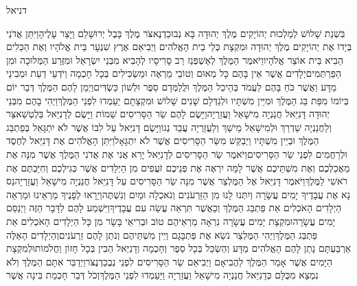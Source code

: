 \documentclass[../main/main.tex]{subfiles}
\begin{document}
\thispagestyle{empty}
\Incipit{}דניאל
\cleardoublepage
\RTLmulticolcolumns
\begin{multicols*}{\ncols}
בִּשְׁנַת שָׁלוֹשׁ לְמַלְכוּת יְהוֹיָקִים מֶלֶךְ יְהוּדָה בָּא נְבוּכַדְנֶאצֹּר מֶלֶךְ בָּבֶל יְרוּשָׁלֵם וַיָּצַר עָלֶיהָ\PreVerseSpace{}וַיִּתֵּן אֲדֹנַי בְּיָדוֹ אֶת יְהוֹיָקִים מֶלֶךְ יְהוּדָה וּמִקְצָת כְּלֵי בֵית הָאֱלֹהִים וַיְבִיאֵם אֶרֶץ שִׁנְעָר בֵּית אֱלֹהָיו וְאֶת הַכֵּלִים הֵבִיא בֵּית אוֹצַר אֱלֹהָיו\PreVerseSpace{}וַיֹּאמֶר הַמֶּלֶךְ לְאַשְׁפְּנַז רַב סָרִיסָיו לְהָבִיא מִבְּנֵי יִשְׂרָאֵל וּמִזֶּרַע הַמְּלוּכָה וּמִן הַפַּרְתְּמִים\PreVerseSpace{}יְלָדִים אֲשֶׁר אֵין בָּהֶם כָּל מְאוּם וְטוֹבֵי מַרְאֶה וּמַשְׂכִּילִים בְּכָל חָכְמָה וְיֹדְעֵי דַעַת וּמְבִינֵי מַדָּע וַאֲשֶׁר כֹּחַ בָּהֶם לַעֲמֹד בְּהֵיכַל הַמֶּלֶךְ וּלֲלַמְּדָם סֵפֶר וּלְשׁוֹן כַּשְׂדִּים\PreVerseSpace{}וַיְמַן לָהֶם הַמֶּלֶךְ דְּבַר יוֹם בְּיוֹמוֹ מִפַּת בַּג הַמֶּלֶךְ וּמִיֵּין מִשְׁתָּיו וּלְגַדְּלָם שָׁנִים שָׁלוֹשׁ וּמִקְצָתָם יַעַמְדוּ לִפְנֵי הַמֶּלֶךְ\PreVerseSpace{}וַיְהִי בָהֶם מִבְּנֵי יְהוּדָה דָּנִיֵּאל חֲנַנְיָה מִישָׁאֵל וַעֲזַרְיָה\PreVerseSpace{}וַיָּשֶׂם לָהֶם שַׂר הַסָּרִיסִים שֵׁמוֹת וַיָּשֶׂם לְדָנִיֵּאל בֵּלְטְשַׁאצַּר וְלַחֲנַנְיָה שַׁדְרַךְ וּלְמִישָׁאֵל מֵישַׁךְ וְלַעֲזַרְיָה עֲבֵד נְגוֹ\PreVerseSpace{}וַיָּשֶׂם דָּנִיֵּאל עַל לִבּוֹ אֲשֶׁר לֹא יִתְגָּאַל בְּפַתְבַּג הַמֶּלֶךְ וּבְיֵין מִשְׁתָּיו וַיְבַקֵּשׁ מִשַּׂר הַסָּרִיסִים אֲשֶׁר לֹא יִתְגָּאָל\PreVerseSpace{}וַיִּתֵּן הָאֱלֹהִים אֶת דָּנִיֵּאל לְחֶסֶד וּלְרַחֲמִים לִפְנֵי שַׂר הַסָּרִיסִים\PreVerseSpace{}וַיֹּאמֶר שַׂר הַסָּרִיסִים לְדָנִיֵּאל יָרֵא אֲנִי אֶת אֲדֹנִי הַמֶּלֶךְ אֲשֶׁר מִנָּה אֶת מַאֲכַלְכֶם וְאֶת מִשְׁתֵּיכֶם אֲשֶׁר לָמָּה יִרְאֶה אֶת פְּנֵיכֶם זֹעֲפִים מִן הַיְלָדִים אֲשֶׁר כְּגִילְכֶם וְחִיַּבְתֶּם אֶת רֹאשִׁי לַמֶּלֶךְ\PreVerseSpace{}וַיֹּאמֶר דָּנִיֵּאל אֶל הַמֶּלְצַר אֲשֶׁר מִנָּה שַׂר הַסָּרִיסִים עַל דָּנִיֵּאל חֲנַנְיָה מִישָׁאֵל וַעֲזַרְיָה\PreVerseSpace{}נַס נָא אֶת עֲבָדֶיךָ יָמִים עֲשָׂרָה וְיִתְּנוּ לָנוּ מִן הַזֵּרְעֹנִים\SubEnd{} וְנֹאכְלָה וּמַיִם וְנִשְׁתֶּה\PreVerseSpace{}וְיֵרָאוּ לְפָנֶיךָ מַרְאֵינוּ וּמַרְאֵה הַיְלָדִים הָאֹכְלִים אֵת פַּתְבַּג הַמֶּלֶךְ וְכַאֲשֶׁר תִּרְאֵה עֲשֵׂה עִם עֲבָדֶיךָ\PreVerseSpace{}וַיִּשְׁמַע לָהֶם לַדָּבָר הַזֶּה וַיְנַסֵּם יָמִים עֲשָׂרָה\PreVerseSpace{}וּמִקְצָת יָמִים עֲשָׂרָה נִרְאָה מַרְאֵיהֶם טוֹב וּבְרִיאֵי בָּשָׂר מִן כָּל הַיְלָדִים הָאֹכְלִים אֵת פַּתְבַּג הַמֶּלֶךְ\PreVerseSpace{}וַיְהִי הַמֶּלְצַר נֹשֵׂא אֶת פַּתְבָּגָם וְיֵין מִשְׁתֵּיהֶם וְנֹתֵן לָהֶם זֵרְעֹנִים\PreVerseSpace{}וְהַיְלָדִים הָאֵלֶּה אַרְבַּעְתָּם נָתַן לָהֶם הָאֱלֹהִים מַדָּע וְהַשְׂכֵּל בְּכָל סֵפֶר וְחָכְמָה וְדָנִיֵּאל הֵבִין בְּכָל חָזוֹן וַחֲלֹמוֹת\PreVerseSpace{}וּלְמִקְצָת הַיָּמִים אֲשֶׁר אָמַר הַמֶּלֶךְ לַהֲבִיאָם וַיְבִיאֵם שַׂר הַסָּרִיסִים לִפְנֵי נְבֻכַדְנֶצֹּר\PreVerseSpace{}וַיְדַבֵּר אִתָּם הַמֶּלֶךְ וְלֹא נִמְצָא מִכֻּלָּם כְּדָנִיֵּאל חֲנַנְיָה מִישָׁאֵל וַעֲזַרְיָה וַיַּעַמְדוּ לִפְנֵי הַמֶּלֶךְ\PreVerseSpace{}וְכֹל דְּבַר חָכְמַת בִּינָה אֲשֶׁר 
\end{multicols*}
\end{document}
